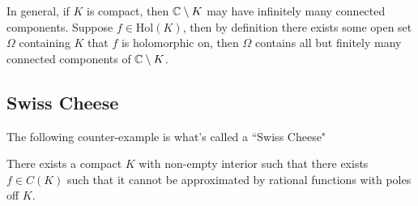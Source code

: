 \begin{remark}
    In general, if $K$ is compact, then $\mathbb{C} \setminus K$ may have infinitely many connected components. Suppose $f \in \text{Hol}(K)$, then by definition there exists some open set $\Omega$ containing $K$ that $f$ is holomorphic on, then $\Omega$ contains all but finitely many connected components of $\mathbb{C} \setminus K$.
\end{remark}

\subsection{Swiss Cheese}
The following counter-example is what's called a ``Swiss Cheese"
\begin{proposition}
    There exists a compact $K$ with non-empty interior such that there exists $f \in C(K)$ such that it cannot be approximated by rational functions with poles off $K$.
\end{proposition}

